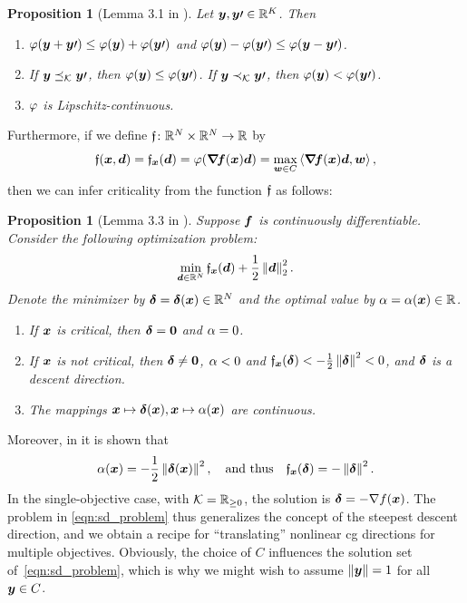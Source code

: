 \documentclass{article}
\theoremstyle{plain}
\newtheorem{proposition}[theorem]{Proposition}
\theoremstyle{definition}
\begin{document}
\begin{proposition}[{Lemma 3.1 in \cite{granadrummondSteepestDescentMethod2005}}]%
	\label{thm:phiC_properties}
	Let $\bm{y}, \bm{y}\prime \in \mathbb R^K$.
	Then
	\begin{enumerate}
		\item $\varphi(\bm{y}+\bm{y}\prime) \le \varphi(\bm{y}) + \varphi(\bm{y}\prime)$
			and $\varphi(\bm{y})-\varphi(\bm{y}\prime) \le \varphi(\bm{y}-\bm{y}\prime)$.
		\item If $\bm{y} \preceq_\mathcal K \bm{y}\prime$, then $\varphi(\bm{y}) \leq \varphi(\bm{y}\prime)$.
			If $\bm{y} \prec_\mathcal K \bm{y}\prime$, then $\varphi(\bm{y}) < \varphi(\bm{y}\prime)$.
		\item $\varphi$ is Lipschitz-continuous.
	\end{enumerate}
\end{proposition}

Furthermore, if we define $\mathfrak{f}\colon \mathbb R^N\times\mathbb R^N \to \mathbb R$ by
\begin{equation*}
	\mathfrak{f}(\bm{x}, \bm{d})
	=
		\mathfrak{f}_{\bm{x}}(\bm{d})
	= 
		\varphi(\bm{\nabla}\!\bm{f}(\bm{x})\bm{d}) 
	= 
		\max_{\bm{w}\in C} \left\langle \bm{\nabla}\!\bm{f}(\bm{x})\bm{d}, \bm{w} \right\rangle
	,
\end{equation*}
then we can infer criticality from the function $\mathfrak{f}$ as follows:

\begin{proposition}[{Lemma 3.3 in \cite{granadrummondSteepestDescentMethod2005}}]%
	\label{thm:criticality_properties}
	Suppose $\bm{f}$ is continuously differentiable.
	Consider the following optimization problem:
	\begin{equation}
		\min_{\bm{d}\in \mathbb R^N} 
			\mathfrak{f}_{\bm{x}}(\bm{d}) + \frac{1}{2}\left\|\bm{d}\right\|_2^2
		.
		\label{eqn:sd_problem}
	\end{equation}
	Denote the minimizer by $\bm{\delta} = \bm{\delta}(\bm{x}) \in \mathbb R^N$ and 
	the optimal value by $\alpha = \alpha(\bm{x}) \in \mathbb R$.
	\begin{enumerate}
		\item If $\bm{x}$ is critical, then $\bm{\delta} = \bm{0}$ and $\alpha = 0$.
		\item If $\bm{x}$ is \emph{not} critical, then $\bm{\delta} \neq \bm{0}$, $\alpha<0$
			and $\mathfrak{f}_{\bm{x}}(\bm{\delta}) < - \frac{1}{2}\left\|\bm{\delta}\right\|^2 < 0$,
			and $\bm{\delta}$ is a descent direction.
		\item The mappings $\bm{x} \mapsto \bm{\delta}(\bm{x}), \bm{x} \mapsto \alpha(\bm{x})$ are
			continuous.
	\end{enumerate}
\end{proposition}
Moreover, in \cite{granadrummondSteepestDescentMethod2005} it is shown that
$$
\alpha(\bm{x}) = - \frac{1}{2}\left\|\bm{\delta}(\bm{x})\right\|^2,
\quad\text{and thus}\quad
\mathfrak{f}_{\bm{x}}(\bm{\delta}) = -\left\|\bm{\delta}\right\|^2.
$$
In the single-objective case, with $\mathcal K = \mathbb R_{\ge 0}$, the solution is 
$\bm{\delta} = - \nabla f(\bm{x})$.
The problem in \eqref{eqn:sd_problem} thus generalizes the concept of 
the steepest descent direction, and we obtain a recipe for 
“translating” nonlinear \ac{cg} directions for multiple objectives.
Obviously, the choice of $C$ influences the solution set of~\eqref{eqn:sd_problem},
which is why we might wish to assume $\|\bm{y}\| = 1$ for all $\bm{y} \in C$.
\end{document}
